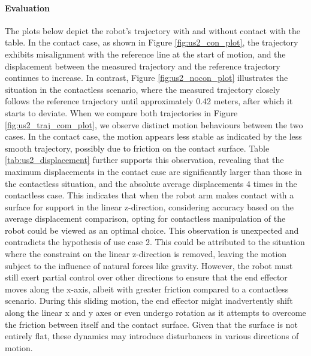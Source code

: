 \documentclass[report.tex]{subfiles}
\begin{document}
    \paragraph{\large{Evaluation}\\}
    The plots below depict the robot's trajectory with and without contact with the table. In the contact case, as shown in Figure \ref{fig:us2_con_plot}, the trajectory exhibits misalignment with the reference line at the start of motion, and the displacement between the measured trajectory and the reference trajectory continues to increase.
    In contrast, Figure \ref{fig:us2_nocon_plot} illustrates the situation in the contactless scenario, where the measured trajectory closely follows the reference trajectory until approximately 0.42 meters, after which it starts to deviate. When we compare both trajectories in Figure \ref{fig:us2_traj_com_plot}, we observe distinct motion behaviours between the two cases.
    In the contact case, the motion appears less stable as indicated by the less smooth trajectory, possibly due to friction on the contact surface. Table \ref{tab:us2_displacement} further supports this observation, revealing that the maximum displacements in the contact case are significantly larger than those in the contactless situation, and the absolute average displacements 4 times in the contactless case.
    This indicates that when the robot arm makes contact with a surface for support in the linear z-direction, considering accuracy based on the average displacement comparison, opting for contactless manipulation of the robot could be viewed as an optimal choice. This observation is unexpected and contradicts the hypothesis of use case 2. This could be attributed to the situation where the constraint on the linear z-direction is removed, leaving the motion subject to the influence of natural forces like gravity. However, the robot must still exert partial control over other directions to ensure that the end effector moves along the x-axis, albeit with greater friction compared to a contactless scenario. During this sliding motion, the end effector might inadvertently shift along the linear x and y axes or even undergo rotation as it attempts to overcome the friction between itself and the contact surface. Given that the surface is not entirely flat, these dynamics may introduce disturbances in various directions of motion.
\end{document}
